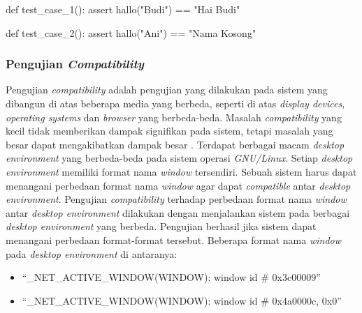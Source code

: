 \begin{center}
\begin{minipage}{0.8\textwidth}
\begin{code}
\begin{ignasicblock}[title=test\_hallo,minted language=Python]
      def test_case_1():
          assert hallo("Budi") == "Hai Budi"

      def test_case_2():
          assert hallo("Ani") == "Nama Kosong"
\end{ignasicblock}
\label{ts:hallo}
\end{code}
\end{minipage}
\end{center}

\subsubsection{Pengujian \emph{Compatibility}}

Pengujian \emph{compatibility} adalah pengujian yang dilakukan pada sistem yang
dibangun di atas beberapa media yang berbeda, seperti di atas \emph{display
  devices, operating systems} dan \emph{browser} yang
berbeda-beda. Masalah \emph{compatibility} yang kecil tidak memberikan
dampak signifikan pada sistem, tetapi masalah yang besar dapat
mengakibatkan dampak besar \parencite{pressman2010software}. Terdapat berbagai macam \emph{desktop
  environment} yang berbeda-beda pada sistem operasi \emph{GNU/Linux}. Setiap
\emph{desktop environment} memiliki format nama \emph{window} tersendiri. Sebuah
sistem harus dapat menangani perbedaan format nama \emph{window} agar dapat
\emph{compatible} antar \emph{desktop environment}. Pengujian \emph{compatibility}
terhadap perbedaan format nama \emph{window} antar \emph{desktop environment}
dilakukan dengan menjalankan sistem pada berbagai \emph{desktop environment} yang berbeda. Pengujian
berhasil jika sistem dapat menangani perbedaan format-format tersebut.
Beberapa format nama \emph{window} pada \emph{desktop environment} di antaranya:

\begin{itemize}
\item ``\_NET\_ACTIVE\_WINDOW(WINDOW): window id \# 0x3c00009''
\item ``\_NET\_ACTIVE\_WINDOW(WINDOW): window id \# 0x4a0000c, 0x0''
\end{itemize}

